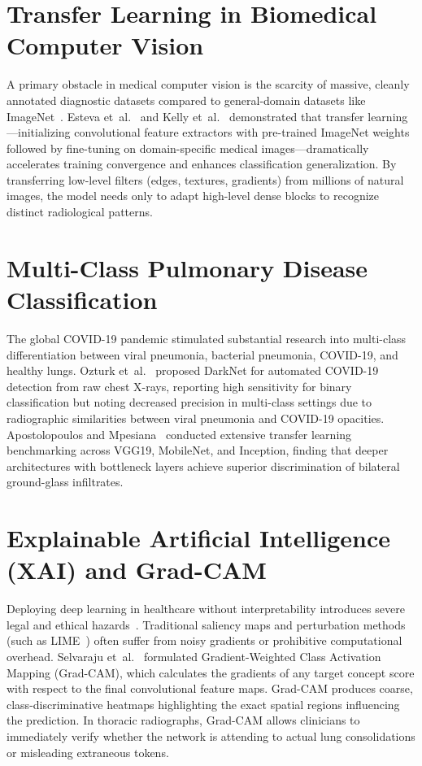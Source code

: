 \documentclass[12pt,a4paper]{report}
\begin{document}
\section{Transfer Learning in Biomedical Computer Vision}
A primary obstacle in medical computer vision is the scarcity of massive, cleanly annotated diagnostic datasets compared to general-domain datasets like ImageNet~\cite{ref_deng2009_imagenet}. Esteva et~al.~\cite{ref_esteva2019_healthcare} and Kelly et~al.~\cite{ref_kelly2019_clinicalai} demonstrated that transfer learning---initializing convolutional feature extractors with pre-trained ImageNet weights followed by fine-tuning on domain-specific medical images---dramatically accelerates training convergence and enhances classification generalization. By transferring low-level filters (edges, textures, gradients) from millions of natural images, the model needs only to adapt high-level dense blocks to recognize distinct radiological patterns.

\section{Multi-Class Pulmonary Disease Classification}
The global COVID-19 pandemic stimulated substantial research into multi-class differentiation between viral pneumonia, bacterial pneumonia, COVID-19, and healthy lungs. Ozturk et~al.~\cite{ref_ozturk2020_covid} proposed DarkNet for automated COVID-19 detection from raw chest X-rays, reporting high sensitivity for binary classification but noting decreased precision in multi-class settings due to radiographic similarities between viral pneumonia and COVID-19 opacities. Apostolopoulos and Mpesiana~\cite{ref_apostolopoulos2020_covid} conducted extensive transfer learning benchmarking across VGG19, MobileNet, and Inception, finding that deeper architectures with bottleneck layers achieve superior discrimination of bilateral ground-glass infiltrates.

\section{Explainable Artificial Intelligence (XAI) and Grad-CAM}
Deploying deep learning in healthcare without interpretability introduces severe legal and ethical hazards~\cite{ref_topol2019_highperformance}. Traditional saliency maps and perturbation methods (such as LIME~\cite{ref_ribeiro2016_lime}) often suffer from noisy gradients or prohibitive computational overhead. Selvaraju et~al.~\cite{ref_selvaraju2017_gradcam} formulated Gradient-Weighted Class Activation Mapping (Grad-CAM), which calculates the gradients of any target concept score with respect to the final convolutional feature maps. Grad-CAM produces coarse, class-discriminative heatmaps highlighting the exact spatial regions influencing the prediction. In thoracic radiographs, Grad-CAM allows clinicians to immediately verify whether the network is attending to actual lung consolidations or misleading extraneous tokens.
\end{document}
